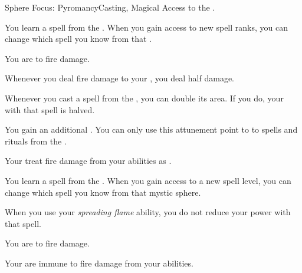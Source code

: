     \begin{feat}{Sphere Focus: Pyromancy}{Casting, Magical}
        \featpre Access to the  .

         You learn a spell from the  .
        When you gain access to new spell ranks, you can change which spell you know from that .

         You are  to fire damage.

         Whenever you deal fire damage to your , you deal half damage.

         Whenever you cast a spell from the  , you can double its area.
        If you do, your  with that spell is halved.

         You gain an additional .
        You can only use this attunement point to  to spells and rituals from the  .

         Your  treat fire damage from your abilities as .

         You learn a spell from the  .
        When you gain access to a new spell level, you can change which spell you know from that mystic sphere.

         When you use your \textit{spreading flame} ability, you do not reduce your power with that spell.

         You are  to fire damage.

         Your  are immune to fire damage from your abilities.
    \end{feat}

